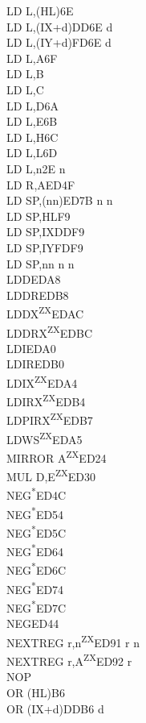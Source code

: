 \documentclass[oneside,a4paper]{book}
\begin{document}
\begin{multicols}{3}
{\begin{tabbing}
LD L,(HL)\>6E\\
LD L,(IX+d)\>DD6E d\\
LD L,(IY+d)\>FD6E d\\
LD L,A\>6F\\
LD L,B\\
LD L,C\\
LD L,D\>6A\\
LD L,E\>6B\\
LD L,H\>6C\\
LD L,L\>6D\\
LD L,n\>2E n\\
LD R,A\>ED4F\\
LD SP,(nn)\>ED7B n n\\
LD SP,HL\>F9\\
LD SP,IX\>DDF9\\
LD SP,IY\>FDF9\\
LD SP,nn n n\\
LDD\>EDA8\\
LDDR\>EDB8\\
LDDX\textsuperscript{ZX}\>EDAC\\
LDDRX\textsuperscript{ZX}\>EDBC\\
LDI\>EDA0\\
LDIR\>EDB0\\
LDIX\textsuperscript{ZX}\>EDA4\\
LDIRX\textsuperscript{ZX}\>EDB4\\
LDPIRX\textsuperscript{ZX}\>EDB7\\
LDWS\textsuperscript{ZX}\>EDA5\\
MIRROR A\textsuperscript{ZX}\>ED24\\
MUL D,E\textsuperscript{ZX}\>ED30\\
NEG\textsuperscript{*}\>ED4C\\
NEG\textsuperscript{*}\>ED54\\
NEG\textsuperscript{*}\>ED5C\\
NEG\textsuperscript{*}\>ED64\\
NEG\textsuperscript{*}\>ED6C\\
NEG\textsuperscript{*}\>ED74\\
NEG\textsuperscript{*}\>ED7C\\
NEG\>ED44\\
NEXTREG r,n\textsuperscript{ZX}\>ED91 r n\\
NEXTREG r,A\textsuperscript{ZX}\>ED92 r\\
NOP\\
OR (HL)\>B6\\
OR (IX+d)\>DDB6 d\\

\end{tabbing}}
\end{multicols}
\end{document}
